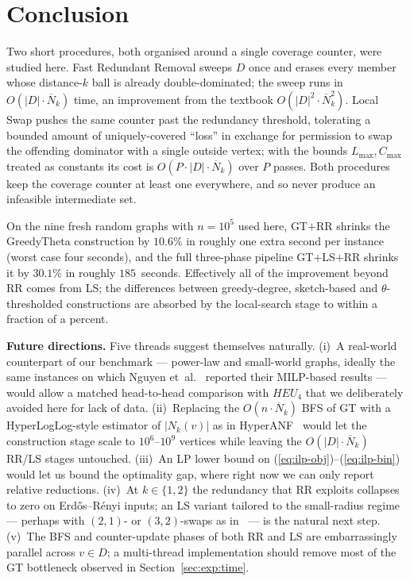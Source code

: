 \documentclass[11pt,a4paper]{article}
\newcommand{\Nk}{\overline{N}_k}
\begin{document}
\section{Conclusion}
\label{sec:conclusion}

Two short procedures, both organised around a single coverage
counter, were studied here. Fast Redundant Removal sweeps $D$ once
and erases every member whose distance-$k$ ball is already
double-dominated; the sweep runs in $O(|D|\cdot\Nk)$ time, an
improvement from the textbook $O(|D|^2\cdot\Nk^2)$. Local Swap pushes
the same counter past the redundancy threshold, tolerating a bounded
amount of uniquely-covered ``loss'' in exchange for permission to
swap the offending dominator with a single outside vertex; with the
bounds $L_{\max},C_{\max}$ treated as constants its cost is
$O(P\cdot|D|\cdot\Nk)$ over $P$ passes. Both procedures keep the
coverage counter at least one everywhere, and so never produce an
infeasible intermediate set.

On the nine fresh random graphs with $n=10^5$ used here, GT$+$RR
shrinks the GreedyTheta construction by $10.6\%$ in roughly one
extra second per instance (worst case four seconds), and the full
three-phase pipeline GT$+$LS$+$RR shrinks it by $30.1\%$ in roughly
$185$~seconds. Effectively all of the improvement beyond RR comes
from LS; the differences between greedy-degree, sketch-based and
$\theta$-thresholded constructions are absorbed by the local-search
stage to within a fraction of a percent.

\textbf{Future directions.}
Five threads suggest themselves naturally.
(i)~A real-world counterpart of our benchmark — power-law and
small-world graphs, ideally the same instances on which Nguyen
et~al.~\cite{nguyen2020} reported their MILP-based results — would
allow a matched head-to-head comparison with $\mathit{HEU_4}$ that we
deliberately avoided here for lack of data.
(ii)~Replacing the $O(n\cdot\Nk)$ BFS of GT with a HyperLogLog-style
estimator of $|N_k(v)|$ as in HyperANF~\cite{boldi2011} would let
the construction stage scale to $10^6$--$10^9$ vertices while leaving
the $O(|D|\cdot\Nk)$ RR/LS stages untouched.
(iii)~An LP lower bound on (\ref{eq:ilp-obj})--(\ref{eq:ilp-bin})
would let us bound the optimality gap, where right now we can only
report relative reductions.
(iv)~At $k\in\{1,2\}$ the redundancy that RR exploits collapses to
zero on Erd\H{o}s--R\'enyi inputs; an LS variant tailored to the
small-radius regime — perhaps with $(2,1)$- or $(3,2)$-swaps as
in~\cite{zhu2024} — is the natural next step.
(v)~The BFS and counter-update phases of both RR and LS are
embarrassingly parallel across $v\in D$; a multi-thread
implementation should remove most of the GT bottleneck observed in
Section~\ref{sec:exp:time}.
\end{document}
